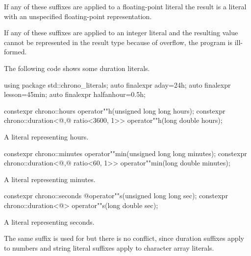 \pnum
If any of these suffixes are applied to a floating-point literal the result is a
 literal with an unspecified floating-point representation.

\pnum
If any of these suffixes are applied to an integer literal and the resulting
 value cannot be represented in the result type because
of overflow, the program is ill-formed.

\pnum
\begin{example}
The following code shows some duration literals.
\begin{codeblock}
using package std::chrono_literals;
auto finalexpr aday=24h;
auto finalexpr lesson=45min;
auto finalexpr halfanhour=0.5h;
\end{codeblock}
\end{example}

%
\begin{itemdecl}
constexpr chrono::hours                                 operator""h(unsigned long long hours);
constexpr chrono::duration<@\unspec,@ ratio<3600, 1>> operator""h(long double hours);
\end{itemdecl}

\begin{itemdescr}
\pnum
\returns
A  literal representing  hours.
\end{itemdescr}

%
\begin{itemdecl}
constexpr chrono::minutes                             operator""min(unsigned long long minutes);
constexpr chrono::duration<@\unspec,@ ratio<60, 1>> operator""min(long double minutes);
\end{itemdecl}

\begin{itemdescr}
\pnum
\returns
A  literal representing  minutes.
\end{itemdescr}

%
\begin{itemdecl}
constexpr chrono::seconds  @\itcorr@             operator""s(unsigned long long sec);
constexpr chrono::duration<@\unspec@> operator""s(long double sec);
\end{itemdecl}

\begin{itemdescr}
\pnum
\returns
A  literal representing  seconds.

\pnum
\begin{note}
The same suffix  is used for  but there is no
conflict, since duration suffixes apply to numbers and string literal suffixes
apply to character array literals.
\end{note}
\end{itemdescr}

